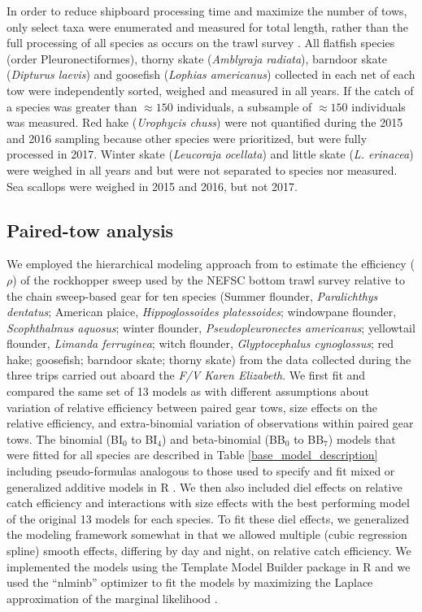 \documentclass[
  12pt,
]{article}
\begin{document}
In order to reduce shipboard processing time and maximize the number of
tows, only select taxa were enumerated and measured for total length,
rather than the full processing of all species as occurs on the trawl
survey \citep{politisetal14}. All flatfish species (order
Pleuronectiformes), thorny skate (\emph{Amblyraja radiata}), barndoor
skate (\emph{Dipturus laevis}) and goosefish (\emph{Lophias americanus})
collected in each net of each tow were independently sorted, weighed and
measured in all years. If the catch of a species was greater than
\({\approx}150\) individuals, a subsample of \({\approx}150\)
individuals was measured. Red hake (\emph{Urophycis chuss}) were not
quantified during the 2015 and 2016 sampling because other species were
prioritized, but were fully processed in 2017. Winter skate
(\emph{Leucoraja ocellata}) and little skate (\emph{L. erinacea}) were
weighed in all years and but were not separated to species nor measured.
Sea scallops were weighed in 2015 and 2016, but not 2017.

\hypertarget{paired-tow-analysis}{%
\subsection{Paired-tow analysis}\label{paired-tow-analysis}}

We employed the hierarchical modeling approach from \citet{miller13} to
estimate the efficiency (\(\rho\)) of the rockhopper sweep used by the
NEFSC bottom trawl survey relative to the chain sweep-based gear for ten
species (Summer flounder, \emph{Paralichthys dentatus}; American plaice,
\emph{Hippoglossoides platessoides}; windowpane flounder,
\emph{Scophthalmus aquosus}; winter flounder, \emph{Pseudopleuronectes
americanus}; yellowtail flounder, \emph{Limanda ferruginea}; witch
flounder, \emph{Glyptocephalus cynoglossus}; red hake; goosefish;
barndoor skate; thorny skate) from the data collected during the three
trips carried out aboard the \emph{F/V Karen Elizabeth}. We first fit
and compared the same set of 13 models as \citet{miller13} with
different assumptions about variation of relative efficiency between
paired gear tows, size effects on the relative efficiency, and
extra-binomial variation of observations within paired gear tows. The
binomial (BI\(_0\) to BI\(_4\)) and beta-binomial (BB\(_0\) to BB\(_7\))
models that were fitted for all species are described in Table
\ref{base_model_description} including pseudo-formulas analogous to
those used to specify and fit mixed or generalized additive models in R
\citep{R19,wood06}. We then also included diel effects on relative catch
efficiency and interactions with size effects with the best performing
model of the original 13 models for each species. To fit these diel
effects, we generalized the modeling framework somewhat in that we
allowed multiple (cubic regression spline) smooth effects, differing by
day and night, on relative catch efficiency. We implemented the models
using the Template Model Builder package \citep{kristensenetal16} in R
and we used the ``nlminb'' optimizer to fit the models by maximizing the
Laplace approximation of the marginal likelihood \citep{R19}.
\end{document}
